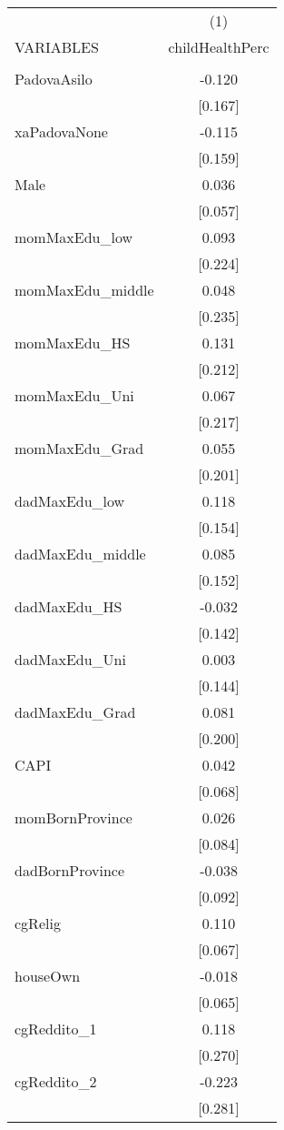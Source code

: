 \documentclass[]{article}
\begin{document}
\begin{tabular}{lc} \hline
 & (1) \\
VARIABLES & childHealthPerc \\ \hline
 &  \\
PadovaAsilo & -0.120 \\
 & [0.167] \\
xaPadovaNone & -0.115 \\
 & [0.159] \\
Male & 0.036 \\
 & [0.057] \\
momMaxEdu\_low & 0.093 \\
 & [0.224] \\
momMaxEdu\_middle & 0.048 \\
 & [0.235] \\
momMaxEdu\_HS & 0.131 \\
 & [0.212] \\
momMaxEdu\_Uni & 0.067 \\
 & [0.217] \\
momMaxEdu\_Grad & 0.055 \\
 & [0.201] \\
dadMaxEdu\_low & 0.118 \\
 & [0.154] \\
dadMaxEdu\_middle & 0.085 \\
 & [0.152] \\
dadMaxEdu\_HS & -0.032 \\
 & [0.142] \\
dadMaxEdu\_Uni & 0.003 \\
 & [0.144] \\
dadMaxEdu\_Grad & 0.081 \\
 & [0.200] \\
CAPI & 0.042 \\
 & [0.068] \\
momBornProvince & 0.026 \\
 & [0.084] \\
dadBornProvince & -0.038 \\
 & [0.092] \\
cgRelig & 0.110 \\
 & [0.067] \\
houseOwn & -0.018 \\
 & [0.065] \\
cgReddito\_1 & 0.118 \\
 & [0.270] \\
cgReddito\_2 & -0.223 \\
 & [0.281] \\

\end{tabular}
\end{document}

